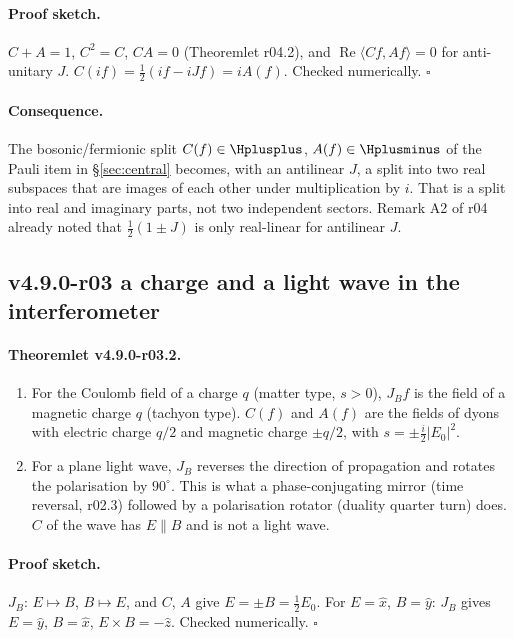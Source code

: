 \paragraph{Proof sketch.}
\(C+A=1\), \(C^2=C\), \(CA=0\) (Theoremlet r04.2), and \(\operatorname{Re}\langle Cf,Af\rangle=0\) for anti-unitary \(J\).
\(C(if)=\tfrac12(if-iJf)=iA(f)\).  Checked numerically.  \(\square\)

\paragraph{Consequence.}
The bosonic/fermionic split \(C(f)\in\Hplusplus\), \(A(f)\in\Hplusminus\) of the Pauli item in
\S\ref{sec:central} becomes, with an antilinear \(J\), a split into two real subspaces that are images of each other
under multiplication by \(i\).  That is a split into real and imaginary parts, not two independent sectors.  Remark A2 of
r04 already noted that \(\tfrac12(1\pm J)\) is only real-linear for antilinear \(J\).

\subsection*{v4.9.0-r03 a charge and a light wave in the interferometer}
\label{subsec:v490-r03-charge-light}

\paragraph{Theoremlet v4.9.0-r03.2.}
\begin{enumerate}[leftmargin=2em]
\item[(a)] For the Coulomb field of a charge \(q\) (matter type, \(s>0\)), \(J_Bf\) is the field of a magnetic charge
\(q\) (tachyon type).  \(C(f)\) and \(A(f)\) are the fields of dyons with electric charge \(q/2\) and magnetic charge
\(\pm q/2\), with \(s=\pm\tfrac i2|E_0|^2\).
\item[(b)] For a plane light wave, \(J_B\) reverses the direction of propagation and rotates the polarisation by
\(90^\circ\).  This is what a phase-conjugating mirror (time reversal, r02.3) followed by a polarisation rotator (duality
quarter turn) does.  \(C\) of the wave has \(E\parallel B\) and is not a light wave.
\end{enumerate}

\paragraph{Proof sketch.}
\(J_B\): \(E\mapsto B\), \(B\mapsto E\), and \(C\), \(A\) give \(E=\pm B=\tfrac12E_0\).  For \(E=\hat x\), \(B=\hat y\):
\(J_B\) gives \(E=\hat y\), \(B=\hat x\), \(E\times B=-\hat z\).  Checked numerically.  \(\square\)


